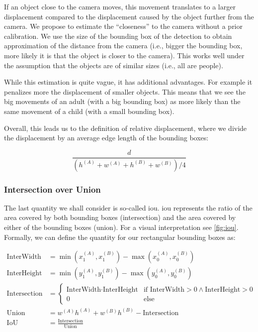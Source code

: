 If an object close to the camera moves, this movement translates to a larger displacement compared to the displacement caused by the object further from the camera. We propose to estimate the ``closeness'' to the camera without a prior calibration. We use the size of the bounding box of the detection to obtain approximation of the distance from the camera (i.e., bigger the bounding box, more likely it is that the object is closer to the camera). This works well under the assumption that the objects are of similar sizes (i.e., all are people).

While this estimation is quite vague, it has additional advantages. For example it penalizes more the displacement of smaller objects. This means that we see the big movements of an adult (with a big bounding box) as more likely than the same movement of a child (with a small bounding box).

Overall, this leads us to the definition of relative displacement, where we divide the displacement by an average edge length of the bounding boxes:

$$\frac{d}{\left(h^{(A)} + w^{(A)} + h^{(B)} + w^{(B)}\right) / 4}$$

\subsubsection{Intersection over Union}

The last quantity we shall consider is so-called \gls{iou}. \Gls{iou} represents the ratio of the area covered by both bounding boxes (intersection) and the area covered by either of the bounding boxes (union). For a visual interpretation see \autoref{fig:iou}. Formally, we can define the quantity for our rectangular bounding boxes as:

\begin{align*}
    \text{InterWidth} &= \min\left(x_1^{(A)}, x_1^{(B)}\right) - \max\left(x_0^{(A)}, x_0^{(B)}\right) \\
    \text{InterHeight} &= \min\left(y_1^{(A)}, y_1^{(B)}\right) - \max\left(y_0^{(A)}, y_0^{(B)}\right) \\
    \text{Intersection} &= \begin{cases}\text{InterWidth} \cdot \text{InterHeight} & \text{if InterWidth} > 0 \land \text{InterHeight} > 0 \\ 0 & \text{else}\end{cases} \\
    \text{Union} &= w^{(A)} h^{(A)} + w^{(B)} h^{(B)} - \text{Intersection} \\
    \text{IoU} &= \frac{\text{Intersection}}{\text{Union}}
\end{align*}

